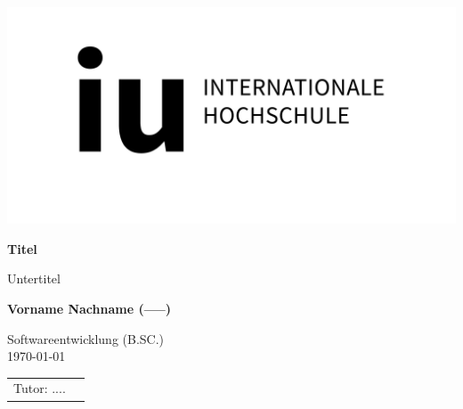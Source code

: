 \def\usesf{}


\setlength{\unitlength}{1pt}

\begin{titlepage}

\vspace{-39pt}\hspace*{300pt}\includegraphics[width=.21\paperwidth]{resources/IU_Logo.png}


\begin{center}
\hbox{}
\vfill
{\usesf}
{\huge\bfseries Titel \par}
Untertitel\\[2mm]
\vskip 1cm


{\large\bfseries Vorname Nachname (-----)\\}

Softwareentwicklung (B.SC.) \\
\today %
\vskip 6cm
\begin{tabular}{p{5cm}l}
Tutor: .... \\
\end{tabular}
\vfill
\end{center}


\end{titlepage}
